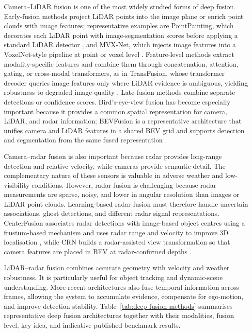 Camera--LiDAR fusion is one of the most widely studied forms of deep fusion. Early-fusion methods project LiDAR points into the image plane or enrich point clouds with image features; representative examples are PointPainting, which decorates each LiDAR point with image-segmentation scores before applying a standard LiDAR detector \cite{vora2020_pointpainting}, and MVX-Net, which injects image features into a VoxelNet-style pipeline at point or voxel level \cite{sindagi2019_mvxnet}. Feature-level methods extract modality-specific features and combine them through concatenation, attention, gating, or cross-modal transformers, as in TransFusion, whose transformer decoder queries image features only where LiDAR evidence is ambiguous, yielding robustness to degraded image quality \cite{bai2022_transfusion}. Late-fusion methods combine separate detections or confidence scores. Bird's-eye-view fusion has become especially important because it provides a common spatial representation for camera, LiDAR, and radar information; BEVFusion is a representative architecture that unifies camera and LiDAR features in a shared BEV grid and supports detection and segmentation from the same fused representation \cite{liu2023_bevfusion}.

Camera--radar fusion is also important because radar provides long-range detection and relative velocity, while cameras provide semantic detail. The complementary nature of these sensors is valuable in adverse weather and low-visibility conditions. However, radar fusion is challenging because radar measurements are sparse, noisy, and lower in angular resolution than images or LiDAR point clouds. Learning-based radar fusion must therefore handle uncertain associations, ghost detections, and different radar signal representations. CenterFusion associates radar detections with image-based object centres using a frustum-based mechanism and uses radar range and velocity to improve 3D localisation \cite{nabati2021_centerfusion}, while CRN builds a radar-assisted view transformation so that camera features are placed in BEV at radar-confirmed depths \cite{kim2023_crn}.

LiDAR--radar fusion combines accurate geometry with velocity and weather robustness. It is particularly useful for object tracking and dynamic-scene understanding. More recent architectures also fuse temporal information across frames, allowing the system to accumulate evidence, compensate for ego-motion, and improve detection stability. Table~\ref{tab:deep-fusion-methods} summarises representative deep fusion architectures together with their modalities, fusion level, key idea, and indicative published benchmark results.

